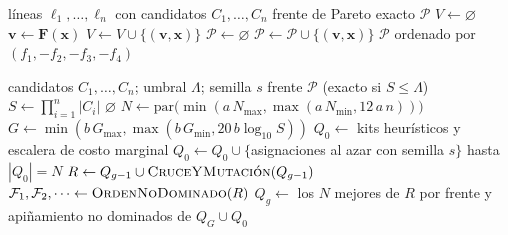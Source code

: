 \begin{algorithm}[htbp]
\caption{Frente exacto por enumeración exhaustiva}
\label{alg:calopt-exhaustivo}
\begin{algorithmic}[1]
\Require líneas $\ell_1,\dots,\ell_n$ con candidatos $C_1,\dots,C_n$
\Ensure frente de Pareto exacto $\mathcal{P}$
  \State $V\gets\varnothing$ 
   
    \State $\mathbf{v}\gets\mathbf{F}(\mathbf{x})$ 
     $V\gets V\cup\{(\mathbf{v},\mathbf{x})\}$ \EndIf
  \EndFor
  \State $\mathcal{P}\gets\varnothing$
   
     
      \State $\mathcal{P}\gets\mathcal{P}\cup\{(\mathbf{v},\mathbf{x})\}$
    \EndIf
  \EndFor
  \State \Return $\mathcal{P}$ ordenado por $(f_1,-f_2,-f_3,-f_4)$
\EndProcedure
\end{algorithmic}
\end{algorithm}

\begin{algorithm}[htbp]
\caption{Conmutación entre el frente exacto y NSGA-II}
\label{alg:calopt-frente}
\begin{algorithmic}[1]
\Require candidatos $C_1,\dots,C_n$; umbral $\Lambda$; semilla $s$
\Ensure frente $\mathcal{P}$ (exacto si $S\leq\Lambda$)
  \State $S\gets\prod_{i=1}^{n}|C_i|$
   \Return $\varnothing$ 
    \State \Return {}
  \EndIf
  \State $N\gets\mathrm{par}\bigl(\min(a\,N_{\max},\max(a\,N_{\min},12\,a\,n))\bigr)$ 
  \State $G\gets\min(b\,G_{\max},\max(b\,G_{\min},20\,b\log_{10}S))$ 
  \State $Q_0\gets$ kits heurísticos y escalera de costo marginal
  \State $Q_0\gets Q_0\cup\{$asignaciones al azar con semilla $s\}$ hasta $|Q_0|=N$
    \State $R\gets Q_{g-1}\cup\textsc{CruceYMutación}(Q_{g-1})$ 
    \State $\mathcal{F}_1,\mathcal{F}_2,\dots\gets\textsc{OrdenNoDominado}(R)$ 
    \State $Q_g\gets$ los $N$ mejores de $R$ por frente y apiñamiento
  \EndFor
  \State \Return no dominados de $Q_G\cup Q_0$ 
\EndProcedure
\end{algorithmic}
\end{algorithm}

